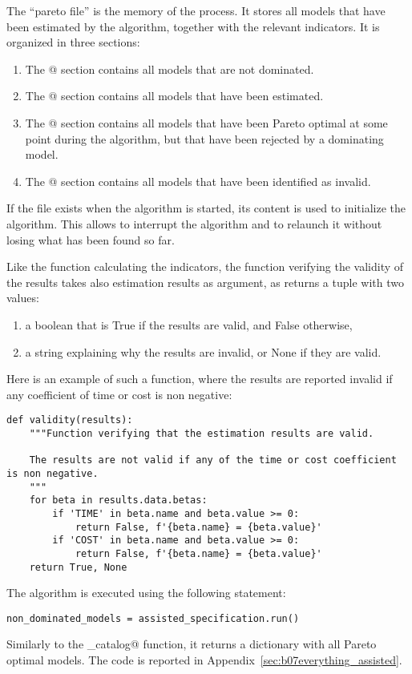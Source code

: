 \documentclass[12pt,a4paper]{article}
\begin{document}
The ``pareto file'' is the memory of the process. It stores all models that have been estimated by the algorithm, together with the relevant indicators. It is organized in three sections:
\begin{enumerate}
\item The \lstinline@[Pareto]@ section contains all models that are not dominated.
\item The \lstinline@[Considered]@ section contains all models that have been estimated.
\item The \lstinline@[Removed]@ section contains all models that have been Pareto optimal at some point during the algorithm, but that have been rejected by a dominating model.
\item The \lstinline@[Invalid]@ section contains all models that have been identified as invalid.
\end{enumerate}
If the file exists when the algorithm is started, its content is used to initialize the algorithm. This allows to interrupt the algorithm and to relaunch it without losing what has been found so far.

Like the function calculating the indicators, the function verifying the validity of the results takes also estimation results as argument, as returns a tuple with two values:
\begin{enumerate}
\item a boolean that is True if the results are valid, and False otherwise,
\item a string explaining why the results are invalid, or None if they are valid.
\end{enumerate}
Here is an example of such a function, where the results are reported invalid if any coefficient of time or cost is non negative:
\begin{lstlisting}
def validity(results):
    """Function verifying that the estimation results are valid.

    The results are not valid if any of the time or cost coefficient is non negative.
    """
    for beta in results.data.betas:
        if 'TIME' in beta.name and beta.value >= 0:
            return False, f'{beta.name} = {beta.value}'
        if 'COST' in beta.name and beta.value >= 0:
            return False, f'{beta.name} = {beta.value}'
    return True, None
\end{lstlisting}

The algorithm is executed using the following statement:
\begin{lstlisting}
non_dominated_models = assisted_specification.run()
\end{lstlisting}
Similarly to the \lstinline@estimate_catalog@ function, it returns a dictionary with all Pareto optimal models. The code is reported in Appendix~\ref{sec:b07everything_assisted}. 
\end{document}
